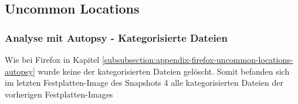 \begin{appendices}


\subsection{Uncommon Locations}
\label{subsection:appendix-tor-uncommon-locations}

\subsubsection*{Analyse mit Autopsy - Kategorisierte Dateien}
\label{subsubsection:appendix-tor-uncommon-locations-autopsy}

Wie bei Firefox in Kapitel \ref{subsubsection:appendix-firefox-uncommon-locations-autopsy} wurde keine der kategorisierten Dateien gelöscht. Somit befanden sich im letzten Festplatten-Image des Snapshots 4 alle kategorisierten Dateien der vorherigen Festplatten-Images


\end{appendices}
